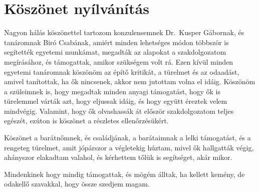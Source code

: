 \documentclass[
]{thesis-ekf}
\theoremstyle{definition}
\theoremstyle{remark}
\begin{document}
\chapter*{Köszönet nyílvánítás}

	Nagyon hálás köszönettel tartozom konzulensemnek Dr.~Kusper Gábornak, és tanáromnak Biró Csabának, amiért minden lehetséges módon többször is segítették egyetemi munkámat, megadták az alapokat a szakdolgozatom megírásához, és támogattak, amikor szükségem volt rá. Ezen kívül minden egyetemi tanáromnak köszönöm az építő kritikát, a türelmet és az odaadást, amivel tanítottak, ha ők nincsenek, akkor nem jutottam volna el idáig. Köszönöm a szüleimnek is, hogy megadtak minden anyagi támogatást, hogy ők is türelemmel várták azt, hogy eljussak idáig, és hogy együtt éreztek velem mindvégig. Valamint, hogy ők olvashassák át először szakdolgozatom teljes egészét, ezúton is köszönet a részletes ellenőrzésükért.

	Köszönet a barátnőmnek, és családjának, a barátaimnak a lelki támogatást, és a rengeteg türelmet, amit jópárszor a végletekig húztam, mivel ők hallgatták végig, ahányszor elakadtam valahol, és kérhettem tőlük is segítséget, akár mikor. 
	
	Mindenkinek hogy mindig támogattak, és mögém álltak, ha kellett kemény, de odakellő szavakkal, hogy össze szedjem magam.
\end{document}
